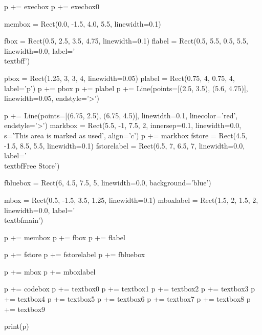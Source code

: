 \begin{python}
p += execbox
p += execbox0

membox = Rect(0.0, -1.5, 4.0, 5.5, linewidth=0.1)

fbox = Rect(0.5, 2.5, 3.5, 4.75, linewidth=0.1)
flabel = Rect(0.5, 5.5, 0.5, 5.5, linewidth=0.0, label='\\textbf{f}')

pbox = Rect(1.25, 3, 3, 4, linewidth=0.05)
plabel = Rect(0.75, 4, 0.75, 4, label='p')
p += pbox
p += plabel
p += Line(points=[(2.5, 3.5), (5.6, 4.75)], linewidth=0.05, endstyle='>')

p += Line(points=[(6.75, 2.5), (6.75, 4.5)], linewidth=0.1, linecolor='red', endstyle='>')
markbox = Rect(5.5, -1, 7.5, 2, innersep=0.1, linewidth=0.0, s='This area is marked as used', align='c')
p += markbox
fstore = Rect(4.5, -1.5, 8.5, 5.5, linewidth=0.1)
fstorelabel = Rect(6.5, 7, 6.5, 7, linewidth=0.0, label='\\textbf{Free Store}')

fbluebox = Rect(6, 4.5, 7.5, 5, linewidth=0.0, background='blue')

mbox = Rect(0.5, -1.5, 3.5, 1.25, linewidth=0.1)
mboxlabel = Rect(1.5, 2, 1.5, 2, linewidth=0.0, label='\\textbf{main}')

p += membox
p += fbox
p += flabel

p += fstore
p += fstorelabel
p += fbluebox

p += mbox
p += mboxlabel

p += codebox
p += textbox0
p += textbox1
p += textbox2
p += textbox3
p += textbox4
p += textbox5
p += textbox6
p += textbox7
p += textbox8
p += textbox9

print(p)
\end{python}

